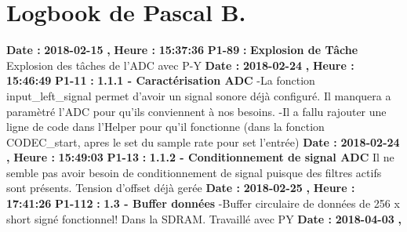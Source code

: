 \documentclass{article}%
\begin{document}
\section{Logbook de Pascal B.}%
\textbf{Date : }%
\textbf{2018{-}02{-}15}%
\textbf{,}%
\textbf{ Heure : }%
\textbf{15:37:36}%
\newline%
%
\textbf{P1{-}89 }%
\textbf{ : }%
\textbf{ Explosion de Tâche}%
\newline%
\newline%
%
Explosion des tâches de l'ADC avec P{-}Y\newline%
\newline%
%
\textbf{Date : }%
\textbf{2018{-}02{-}24}%
\textbf{,}%
\textbf{ Heure : }%
\textbf{15:46:49}%
\newline%
%
\textbf{P1{-}11 }%
\textbf{ : }%
\textbf{ 1.1.1 {-} Caractérisation ADC}%
\newline%
\newline%
%
{-}La fonction input\_left\_signal permet d'avoir un signal sonore déjà configuré. Il manquera a paramètré l'ADC pour qu'ils conviennent à nos besoins.\newline%
{-}Il a fallu rajouter une ligne de code dans l'Helper pour qu'il fonctionne (dans la fonction CODEC\_start, apres le set du sample rate pour set l'entrée)\newline%
\newline%
%
\textbf{Date : }%
\textbf{2018{-}02{-}24}%
\textbf{,}%
\textbf{ Heure : }%
\textbf{15:49:03}%
\newline%
%
\textbf{P1{-}13 }%
\textbf{ : }%
\textbf{ 1.1.2 {-} Conditionnement de signal ADC}%
\newline%
\newline%
%
Il ne semble pas avoir besoin de conditionnement de signal puisque des filtres actifs sont présents.\newline%
Tension d'offset déjà gerée\newline%
\newline%
%
\textbf{Date : }%
\textbf{2018{-}02{-}25}%
\textbf{,}%
\textbf{ Heure : }%
\textbf{17:41:26}%
\newline%
%
\textbf{P1{-}112 }%
\textbf{ : }%
\textbf{ 1.3 {-} Buffer données}%
\newline%
\newline%
%
{-}Buffer circulaire de données de 256 x short signé fonctionnel! Dans la SDRAM. Travaillé avec PY\newline%
\newline%
%
\textbf{Date : }%
\textbf{2018{-}04{-}03}%
\textbf{,}%
\end{document}
